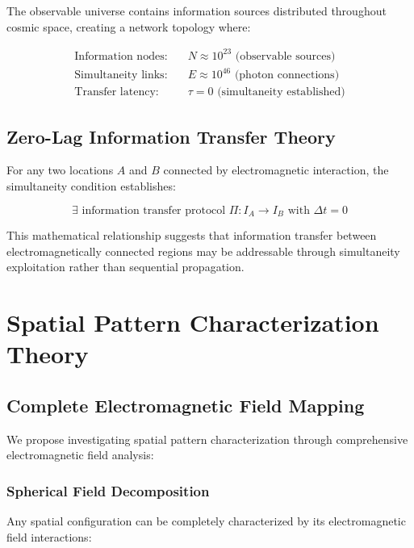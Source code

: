 \documentclass[12pt,a4paper]{article}
\begin{document}
The observable universe contains information sources distributed throughout cosmic space, creating a network topology where:

\begin{align}
\text{Information nodes:} &\quad N \approx 10^{23} \text{ (observable sources)} \\
\text{Simultaneity links:} &\quad E \approx 10^{46} \text{ (photon connections)} \\
\text{Transfer latency:} &\quad \tau = 0 \text{ (simultaneity established)}
\end{align}

\subsection{Zero-Lag Information Transfer Theory}

For any two locations $A$ and $B$ connected by electromagnetic interaction, the simultaneity condition establishes:

\begin{equation}
\exists \text{ information transfer protocol } \Pi: I_A \rightarrow I_B \text{ with } \Delta t = 0
\label{eq:zero_lag_transfer}
\end{equation}

This mathematical relationship suggests that information transfer between electromagnetically connected regions may be addressable through simultaneity exploitation rather than sequential propagation.

\section{Spatial Pattern Characterization Theory}

\subsection{Complete Electromagnetic Field Mapping}

We propose investigating spatial pattern characterization through comprehensive electromagnetic field analysis:

\subsubsection{Spherical Field Decomposition}

Any spatial configuration can be completely characterized by its electromagnetic field interactions:
\end{document}
